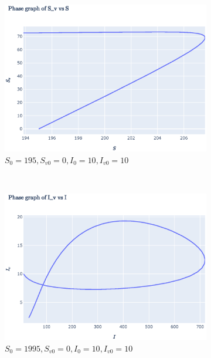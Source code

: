 \documentclass[11pt]{article}
\begin{document}
\begin{figure}[th]
\begin{subfigure}{0.49\textwidth}
	  \includegraphics[width=\linewidth]{../figures/ex2_SvS_2.eps}  
	  \caption{$S_0 = 195, S_{v0} = 0,I_0 = 10, I_{v0} = 10$}
	\end{subfigure}\\
	\begin{subfigure}{0.49\textwidth}
	  \centering
	  \includegraphics[width=\linewidth]{../figures/ex2_IvI_3.eps}  
	  \caption{$S_0 = 1995, S_{v0} = 0,I_0 = 10, I_{v0} = 10$}
	\end{subfigure}
	\begin{subfigure}{0.49\textwidth}
	  \centering

\end{subfigure}
\end{figure}
\end{document}
